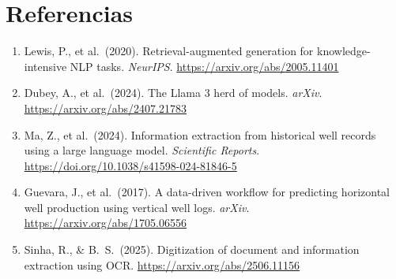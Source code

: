 \documentclass[12pt, a4paper]{report}
\begin{document}
\chapter*{Referencias}

\begin{enumerate}
  \item Lewis, P., et al.\ (2020). Retrieval-augmented generation for knowledge-intensive
    NLP tasks. \textit{NeurIPS}. \url{https://arxiv.org/abs/2005.11401}

  \item Dubey, A., et al.\ (2024). The Llama 3 herd of models. \textit{arXiv}.
    \url{https://arxiv.org/abs/2407.21783}

  \item Ma, Z., et al.\ (2024). Information extraction from historical well records using
    a large language model. \textit{Scientific Reports}.
    \url{https://doi.org/10.1038/s41598-024-81846-5}

  \item Guevara, J., et al.\ (2017). A data-driven workflow for predicting horizontal well
    production using vertical well logs. \textit{arXiv}.
    \url{https://arxiv.org/abs/1705.06556}

  \item Sinha, R., \& B.\ S.\ (2025). Digitization of document and information extraction
    using OCR. \url{https://arxiv.org/abs/2506.11156}
\end{enumerate}
\end{document}
